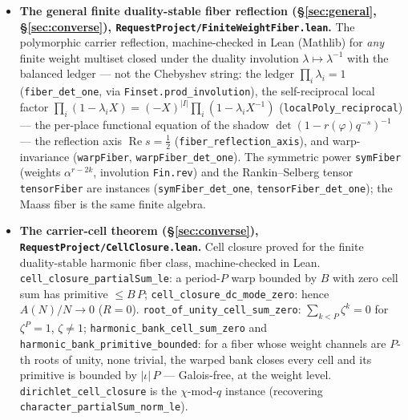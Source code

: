 \documentclass[11pt]{article}
\theoremstyle{definition}
\renewcommand{\Re}{\operatorname{Re}}
\begin{document}
\begin{itemize}
\item \textbf{The general finite duality-stable fiber reflection (\S\ref{sec:general},
\S\ref{sec:converse}), \texttt{RequestProject/FiniteWeightFiber.lean}.} The polymorphic carrier
reflection, machine-checked in Lean (Mathlib) for \emph{any} finite weight multiset closed under the
duality involution $\lambda\mapsto\lambda^{-1}$ with the balanced ledger --- not the Chebyshev string:
the ledger $\prod_i\lambda_i=1$ (\texttt{fiber\_det\_one}, via \texttt{Finset.prod\_involution}), the
self-reciprocal local factor $\prod_i(1-\lambda_iX)=(-X)^{|I|}\prod_i(1-\lambda_iX^{-1})$
(\texttt{localPoly\_reciprocal}) --- the per-place functional equation of the shadow
$\det(1-r(\varphi)q^{-s})^{-1}$ --- the reflection axis $\Re s=\tfrac12$
(\texttt{fiber\_reflection\_axis}), and warp-invariance (\texttt{warpFiber}, \texttt{warpFiber\_det\_one}).
The symmetric power \texttt{symFiber} (weights $\alpha^{r-2k}$, involution \texttt{Fin.rev}) and the
Rankin--Selberg tensor \texttt{tensorFiber} are instances (\texttt{symFiber\_det\_one},
\texttt{tensorFiber\_det\_one}); the Maass fiber is the same finite algebra.  

\item \textbf{The carrier-cell theorem (\S\ref{sec:converse}), \texttt{RequestProject/CellClosure.lean}.}
Cell closure proved for the finite duality-stable harmonic fiber class, machine-checked in Lean.
\texttt{cell\_closure\_partialSum\_le}: a period-$P$ warp bounded by $B$ with zero cell sum has primitive
$\le B\,P$; \texttt{cell\_closure\_dc\_mode\_zero}: hence $A(N)/N\to0$ ($R=0$). \texttt{root\_of\_unity\_cell\_sum\_zero}:
$\sum_{k<P}\zeta^k=0$ for $\zeta^P=1$, $\zeta\ne1$; \texttt{harmonic\_bank\_cell\_sum\_zero} and
\texttt{harmonic\_bank\_primitive\_bounded}: for a fiber whose weight channels are $P$-th roots of unity,
none trivial, the warped bank closes every cell and its primitive is bounded by $|\iota|\,P$ --- Galois-free,
at the weight level. \texttt{dirichlet\_cell\_closure} is the $\chi$-mod-$q$ instance (recovering
\texttt{character\_partialSum\_norm\_le}). 


\end{itemize}
\end{document}
